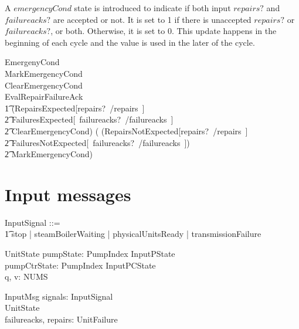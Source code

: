 \documentclass{report} %
\begin{document}
A $emergencyCond$ state is introduced to indicate if both input $repairs?$ and $failureacks?$ are accepted or not. It is set to 1 if there is unaccepted $repairs?$ or $failureacks?$, or both. Otherwise, it is set to 0. This update happens in the beginning of each cycle and the value is used in the later of the cycle.
\begin{zed}
    EmergenyCond  \\ %
    MarkEmergencyCond  \\
    ClearEmergencyCond  \\
    EvalRepairFailureAck \\
        \t1 (RepairsExpected[repairs?~/repairs~] \land \\
            \t2 FailuresExpected[~failureacks?~/failureacks~] \land \\
            \t2 ClearEmergencyCond) \lor ( (RepairsNotExpected[repairs?~/repairs~] \lor \\
            \t2 FailuresNotExpected[~failureacks?~/failureacks~]) \\
            \t2 \land MarkEmergencyCond)  \\
\end{zed}

\section{Input messages}

\begin{zed}
  InputSignal ::= \\
  \t1 stop | steamBoilerWaiting | physicalUnitsReady | transmissionFailure
\end{zed}

\begin{schema}{UnitState}
  pumpState: PumpIndex \fun InputPState \\ %
  pumpCtrState: PumpIndex \fun InputPCState \\ %
  q, v: NUMS
\end{schema}

\begin{schema}{InputMsg}
  signals: \power InputSignal \\ %
  UnitState \\ %
  failureacks, repairs: \power UnitFailure
\end{schema}
\end{document}
